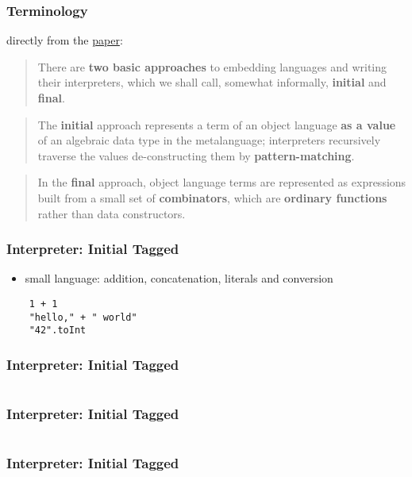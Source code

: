 \documentclass[aspectratio=169, hyperref={colorlinks, linkcolor=beamer@centricgreen}, urlcolor=links]{beamer}
\begin{document}
\begin{frame}
  \frametitle{Terminology}

  directly from the \href{http://okmij.org/ftp/tagless-final/course/lecture.pdf}{paper}:
  \vfill
  \begin{quote}
    There are \textbf{two basic approaches} to embedding languages and
    writing their interpreters, which we shall call, somewhat
    informally, \textbf{initial} and \textbf{final}.
  \end{quote}
  \vfill
  \begin{quote}
    The \textbf{initial} approach represents a term of an object
    language \textbf{as a value} of an algebraic data type in the
    metalanguage; interpreters recursively traverse the values
    de-constructing them by \textbf{pattern-matching}.
  \end{quote}
  \vfill
  \begin{quote}
    In the \textbf{final} approach, object language terms are
    represented as expressions built from a small set of
    \textbf{combinators}, which are \textbf{ordinary functions} rather
    than data constructors.
  \end{quote}
\end{frame}

\begin{frame}[fragile]
  \frametitle{Interpreter: Initial Tagged}
  \begin{itemize}
  \item small language: addition, concatenation, literals and conversion
  \end{itemize}
  \begin{verbatim}
    1 + 1
    "hello," + " world"
    "42".toInt
  \end{verbatim}
\end{frame}

\begin{frame}
  \frametitle{Interpreter: Initial Tagged}
  \inputminted[fontsize=\footnotesize]{scala}{snippets/initial-tagged-expr.scala}
\end{frame}

\begin{frame}
  \frametitle{Interpreter: Initial Tagged}
  \inputminted[fontsize=\footnotesize]{scala}{snippets/initial-tagged-sample.scala}
\end{frame}

\begin{frame}
  \frametitle{Interpreter: Initial Tagged}
  \inputminted[fontsize=\footnotesize]{scala}{snippets/initial-tagged-interp.scala}
\end{frame}
\end{document}
